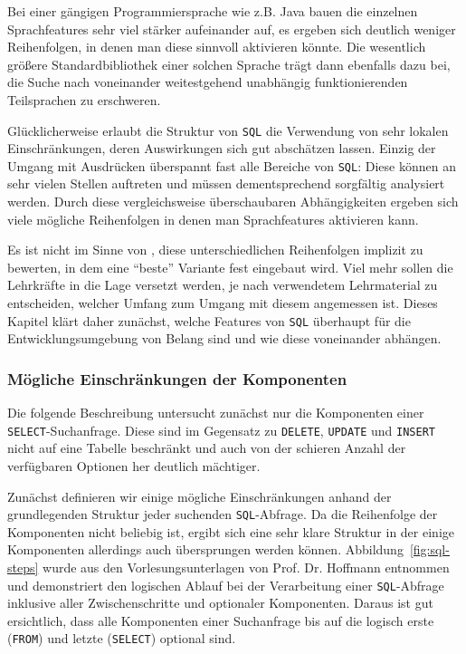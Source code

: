 Bei einer gängigen Programmiersprache wie z.B. Java bauen die einzelnen Sprachfeatures sehr viel stärker aufeinander auf, es ergeben sich deutlich weniger Reihenfolgen, in denen man diese sinnvoll aktivieren könnte. Die wesentlich größere Standardbibliothek einer solchen Sprache trägt dann ebenfalls dazu bei, die Suche nach voneinander weitestgehend unabhängig funktionierenden Teilsprachen zu erschweren.

Glücklicherweise erlaubt die Struktur von \texttt{SQL} die Verwendung von sehr lokalen Einschränkungen, deren Auswirkungen sich gut abschätzen lassen. Einzig der Umgang mit Ausdrücken überspannt fast alle Bereiche von \texttt{SQL}: Diese können an sehr vielen Stellen auftreten und müssen dementsprechend sorgfältig analysiert werden. Durch diese vergleichsweise überschaubaren Abhängigkeiten ergeben sich viele mögliche Reihenfolgen in denen man Sprachfeatures aktivieren kann. 

Es ist nicht im Sinne von \idename{}, diese unterschiedlichen Reihenfolgen implizit zu bewerten, in dem eine "`beste"' Variante fest eingebaut wird. Viel mehr sollen die Lehrkräfte in die Lage versetzt werden, je nach verwendetem Lehrmaterial zu entscheiden, welcher Umfang zum Umgang mit diesem angemessen ist. Dieses Kapitel klärt daher zunächst, welche Features von \texttt{SQL} überhaupt für die Entwicklungsumgebung von Belang sind und wie diese voneinander abhängen.

\subsubsection{Mögliche Einschränkungen der Komponenten}
\label{sec:sql-subset-local}

Die folgende Beschreibung untersucht zunächst nur die Komponenten einer \texttt{SELECT}-Suchanfrage. Diese sind im Gegensatz zu \texttt{DELETE}, \texttt{UPDATE} und \texttt{INSERT} nicht auf eine Tabelle beschränkt und auch von der schieren Anzahl der verfügbaren Optionen her deutlich mächtiger.

Zunächst definieren wir einige mögliche Einschränkungen anhand der grundlegenden Struktur jeder suchenden \texttt{SQL}-Abfrage. Da die Reihenfolge der Komponenten nicht beliebig ist, ergibt sich eine sehr klare Struktur in der einige Komponenten allerdings auch übersprungen werden können. Abbildung~\ref{fig:sql-steps} wurde aus den Vorlesungsunterlagen von Prof. Dr. Hoffmann entnommen und demonstriert den logischen Ablauf bei der Verarbeitung einer \texttt{SQL}-Abfrage inklusive aller Zwischenschritte und optionaler Komponenten. Daraus ist gut ersichtlich, dass alle Komponenten einer Suchanfrage bis auf die logisch erste (\texttt{FROM}) und letzte (\texttt{SELECT}) optional sind.

